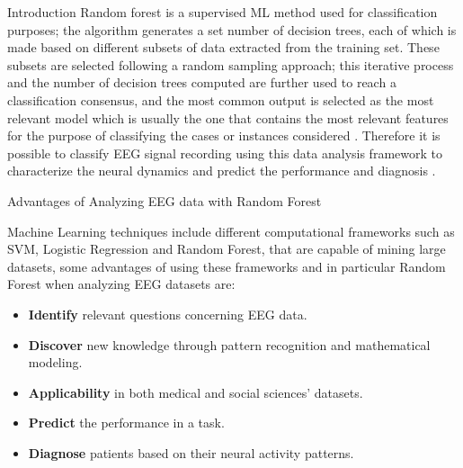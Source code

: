 \documentclass[final]{beamer}
\newlength{\colwidth}
\begin{document}
\begin{frame}[t]
\begin{columns}[t]
\begin{column}{\colwidth}
\begin{block}{Introduction}
    Random forest is a supervised ML method used for classification purposes; the algorithm generates a set number of decision trees, each of which is made based on different subsets of data extracted from the training set. These subsets are selected following a random sampling approach; this iterative process  and the number of decision trees computed are further used to reach a classification consensus, and the most common output is selected as the most relevant model which is usually the one that contains the most relevant features for the purpose of classifying the cases or instances considered \citep{R-randomForest}. Therefore it is possible to classify EEG signal recording using this data analysis framework to characterize the neural dynamics and predict the performance and diagnosis \citep{klimesch1997eeg}.

  \end{block}

  \begin{block}{Advantages of Analyzing EEG data with Random Forest}

  Machine Learning techniques include different computational frameworks such as SVM, Logistic Regression and Random Forest, that are capable of mining large datasets, some advantages of using these frameworks and in particular Random Forest when analyzing EEG datasets are:

    \begin{itemize}
      \item \textbf{Identify} relevant questions concerning EEG data.
      \item \textbf{Discover} new knowledge through pattern recognition and mathematical modeling.
      \item \textbf{Applicability} in both medical and social sciences' datasets.
      \item \textbf{Predict} the performance in a task.
      \item \textbf{Diagnose} patients based on their neural activity patterns.
    \end{itemize}
  \end{block}


\end{column}
\end{columns}
\end{frame}
\end{document}
